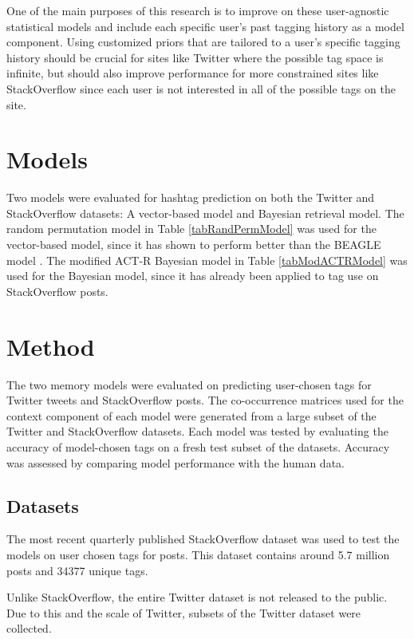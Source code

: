 \documentclass[man,floatsintext,donotrepeattitle]{apa6}
\begin{document}
One of the main purposes of this research is to improve on these user-agnostic statistical models and include each specific user's past tagging history as a model component.
Using customized priors that are tailored to a user's specific tagging history should be crucial for sites like Twitter where the possible tag space is infinite,
but should also improve performance for more constrained sites like StackOverflow since each user is not interested in all of the possible tags on the site. 

\section{Models}

Two models were evaluated for hashtag prediction on both the Twitter and StackOverflow datasets:
A vector-based model and Bayesian retrieval model.
The random permutation model \parencite{Sahlgren2008} in Table \ref{tabRandPermModel} was used for the vector-based model, since it has shown to perform better than the BEAGLE model \parencite{Recchia2010}.
The modified ACT-R Bayesian model \parencite{Stanley2013} in Table \ref{tabModACTRModel} was used for the Bayesian model, since it has already been applied to tag use on StackOverflow posts.

\section{Method}

The two memory models were evaluated on predicting user-chosen tags for Twitter tweets and StackOverflow posts.
The co-occurrence matrices used for the context component of each model were generated from a large subset of the Twitter and StackOverflow datasets.
Each model was tested by evaluating the accuracy of model-chosen tags on a fresh test subset of the datasets.
Accuracy was assessed by comparing model performance with the human data.

\subsection{Datasets}

The most recent quarterly published StackOverflow dataset \parencite{DataDump2014} was used to test the models on user chosen tags for posts.
This dataset contains around \num{5.7} million posts and \num{34377} unique tags.

Unlike StackOverflow, the entire Twitter dataset is not released to the public.
Due to this and the scale of Twitter, subsets of the Twitter dataset were collected.
\end{document}
